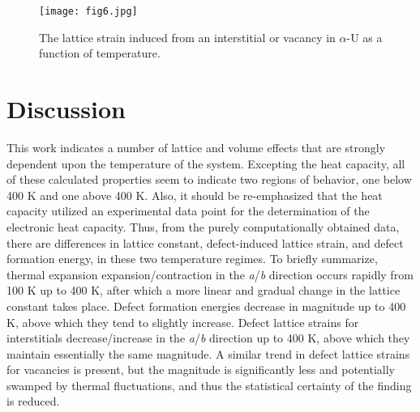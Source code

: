 \documentclass[utf8]{frontiersSCNS} %
\begin{document}
 \begin{figure}[hbt]
	\centering
	\texttt{[image: fig6.jpg]}
    \caption{The lattice strain induced from an interstitial or vacancy in $\alpha$-U as a function of temperature. }\label{fig:strain}
\end{figure}

\FloatBarrier

\section{Discussion}

This work indicates a number of lattice and volume effects that are strongly dependent upon the temperature of the system. Excepting the heat capacity, all of these calculated properties seem to indicate two regions of behavior, one below 400 K and one above 400 K. Also, it should be re-emphasized that the heat capacity utilized an experimental data point for the determination of the electronic heat capacity. Thus, from the purely computationally obtained data, there are differences in lattice constant, defect-induced lattice strain, and defect formation energy, in these two temperature regimes. To briefly summarize, thermal expansion expansion/contraction in the \textit{a}/\textit{b} direction occurs rapidly from 100 K up to 400 K, after which a more linear and gradual change in the lattice constant takes place. Defect formation energies decrease in magnitude up to 400 K, above which they tend to slightly increase. Defect lattice strains for interstitials decrease/increase in the \textit{a}/\textit{b} direction up to 400 K, above which they maintain essentially the same magnitude. A similar trend in defect lattice strains for vacancies is present, but the magnitude is significantly less and potentially swamped by thermal fluctuations, and thus the statistical certainty of the finding is reduced. 
\end{document}
